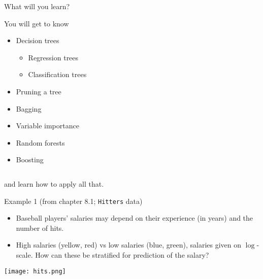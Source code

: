 \documentclass[10pt,ignorenonframetext,]{beamer}
\providecommand{\tightlist}{%
  \setlength{\itemsep}{0pt}\setlength{\parskip}{0pt}}
\begin{document}
\begin{frame}

\begin{block}{What will you learn?}

\vspace{2mm}

You will get to know

\begin{itemize}
\tightlist
\item
  Decision trees

  \begin{itemize}
  \tightlist
  \item
    Regression trees\\
  \item
    Classification trees\\
  \end{itemize}
\item
  Pruning a tree
\item
  Bagging
\item
  Variable importance
\item
  Random forests
\item
  Boosting
\end{itemize}

\(~\)

and learn how to apply all that.

\end{block}

\end{frame}

\begin{frame}[fragile]

\begin{block}{Example 1 (from chapter 8.1; \texttt{Hitters} data)}

\vspace{1mm}

\begin{itemize}
\item
  Baseball players' salaries may depend on their experience (in years)
  and the number of hits.
\item
  High salaries (yellow, red) vs low salaries (blue, green), salaries
  given on \(\log\)-scale. How can these be stratified for prediction of
  the salary?
\end{itemize}

\centering

\texttt{[image: hits.png]}

\end{block}

\end{frame}
\end{document}
